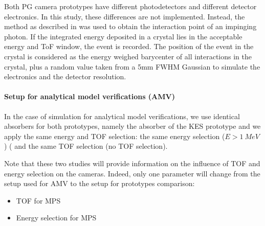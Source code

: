 \documentclass[a4paper,english]{article}
\begin{document}
Both PG camera prototypes have different photodetectors and different detector electronics. In this study, these differences are not implemented. Instead, the method as described in \cite{Gueth2013} was used to obtain the interaction point of an impinging photon. If the integrated energy deposited in a crystal lies in the acceptable energy and ToF window, the event is recorded. The position of the event in the crystal is considered as the energy weighed barycenter of all interactions in the crystal, plus a random value taken from a 5mm FWHM Gaussian to simulate the electronics and the detector resolution.

\paragraph{Setup for analytical model verifications (AMV)}


In the case of simulation for analytical model verifications, we use identical absorbers for both prototypes, namely the absorber of the KES prototype and we apply the same energy and TOF selection: the same energy selection ($E> 1~MeV$) ( and the same TOF selection (no TOF selection).


Note that these two studies will provide information on the influence of TOF and energy selection on the cameras. Indeed, only one parameter will change from the setup used for AMV to the setup for prototypes comparison:
\begin{itemize}
	\item TOF for MPS
	\item Energy selection for MPS
\end{itemize}
\end{document}
